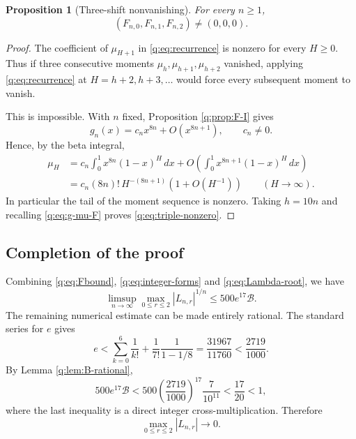 \documentclass[11pt]{amsart}
\newcommand{\dd}{\,d}
\theoremstyle{plain}
\newtheorem{proposition}[theorem]{Proposition}
\theoremstyle{remark}\newtheorem{remark}[theorem]{Remark}
\numberwithin{equation}{section}
\begin{document}
\begin{proposition}[Three-shift nonvanishing]\label{q:prop:nonzero}
For every $n\ge1$,
\begin{equation}\label{q:eq:triple-nonzero}
  (F_{n,0},F_{n,1},F_{n,2})\ne(0,0,0).
\end{equation}
\end{proposition}

\begin{proof}
The coefficient of $\mu_{H+1}$ in \eqref{q:eq:recurrence} is nonzero for every
$H\ge0$.  Thus if three consecutive moments
$\mu_h,\mu_{h+1},\mu_{h+2}$ vanished, applying \eqref{q:eq:recurrence} at
$H=h+2,h+3,\ldots$ would force every subsequent moment to vanish.

This is impossible.  With $n$ fixed, Proposition \ref{q:prop:F-I} gives
\[
 g_n(x)=c_nx^{8n}+O(x^{8n+1}),\qquad c_n\ne0.
\]
Hence, by the beta integral,
\begin{align*}
 \mu_H
 &=c_n\int_0^1x^{8n}(1-x)^H\dd x
   +O\!\left(\int_0^1x^{8n+1}(1-x)^H\dd x\right)\\
 &=c_n(8n)!\,H^{-(8n+1)}(1+O(H^{-1}))
 \qquad(H\to\infty).
\end{align*}
In particular the tail of the moment sequence is nonzero.  Taking $h=10n$
and recalling \eqref{q:eq:g-mu-F} proves \eqref{q:eq:triple-nonzero}.
\end{proof}

\subsection{Completion of the proof}\label{q:sec:completion}

Combining \eqref{q:eq:Fbound}, \eqref{q:eq:integer-forms} and
\eqref{q:eq:Lambda-root}, we have
\begin{equation}\label{q:eq:root-bound-pre}
 \limsup_{n\to\infty}
 \max_{0\le r\le2}|L_{n,r}|^{1/n}
 \le500e^{17}\mathcal B.
\end{equation}
The remaining numerical estimate can be made entirely rational.  The
standard series for $e$ gives
\[
 e<\sum_{k=0}^{6}\frac1{k!}
   +\frac1{7!}\frac1{1-1/8}
 =\frac{31967}{11760}
 <\frac{2719}{1000}.
\]
By Lemma \ref{q:lem:B-rational},
\begin{equation}\label{q:eq:final-exact}
 500e^{17}\mathcal B
 <500\left(\frac{2719}{1000}\right)^{17}
       \frac7{10^{11}}
 <\frac{17}{20}<1,
\end{equation}
where the last inequality is a direct integer cross-multiplication.
Therefore
\begin{equation}\label{q:eq:Ltozero}
  \max_{0\le r\le2}|L_{n,r}|\longrightarrow0.
\end{equation}
\end{document}
